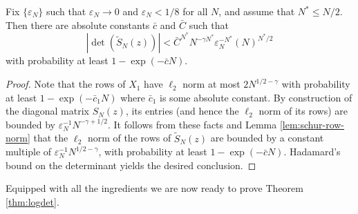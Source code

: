 \documentclass{amsart}
\numberwithin{equation}{section}
\def\corE{}
\def\corAB{}
\begin{document}
\begin{lemma}\label{lem:hadamard}
  Fix $\{\varepsilon_N\}$
such that $\varepsilon_N\to 0$ and $\varepsilon_N <1/8$ for all $N$, and
assume that
$N^* \le N/2$.
Then there are absolute constants $\bar{c}$ and $\bar{C}$ such that
  \[
    |\det(\widetilde{S}_N(z))|
    <
    \bar{C}^{N^*} N^{-\gamma N^*} \varepsilon_{N}^{-N^*} \left(\corE{ N }\right)^{N^*/2}
  \]
  with probability at least $1- \corE{\exp(-\bar{c} N)}$.
\end{lemma}
\begin{proof}
Note that the rows of $X_1$ have $\ell_2$ norm at most
$2N^{1/2-\gamma}$
with probability at least $1-\exp(-\bar{c}_1N)$ where
$\bar{c}_1$ is some absolute constant.
By  construction of the diagonal matrix $S_N(z)$,  its entries (and hence
the $\ell_2$ norm of its rows)
are bounded by \corAB{$\varepsilon_N^{-1} N^{-\gamma+1/2}$}.
It follows from these facts and
Lemma \ref{lem:schur-row-norm} that the
$\ell_2$ norm of the rows of $\widetilde{S}_N(z)$ are bounded
by a constant multiple of $\varepsilon_N^{-1} N^{1/2-\gamma}$,
with probability at least $1-\exp(-\bar{c}N)$.
Hadamard's bound on the determinant yields the desired conclusion.
\end{proof}
Equipped with all the ingredients we are now ready to prove Theorem \ref{thm:logdet}.
\end{document}
